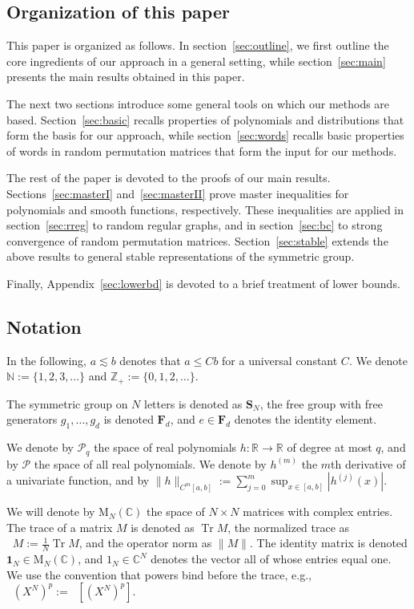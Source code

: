 \documentclass[10pt,reqno]{amsart}
\theoremstyle{definition}
\theoremstyle{remark}
\numberwithin{equation}{section}
\numberwithin{figure}{section}
\numberwithin{table}{section}
\newcommand{\tr}{\mathop{\mathrm{Tr}}}
\newcommand{\ntrN}{\mathop{\mathrm{tr}_N}}
\begin{document}
\subsection*{Organization of this paper}

This paper is organized as follows. In section~\ref{sec:outline}, we first 
outline the core ingredients of our approach in a general setting, while 
section~\ref{sec:main} presents the main results obtained in this paper.

The next two sections introduce some general tools on which our methods 
are based. Section~\ref{sec:basic} recalls properties of polynomials and 
distributions that form the basis for our approach, while 
section~\ref{sec:words} recalls basic properties of words in random 
permutation matrices that form the input for our methods.

The rest of the paper is devoted to the proofs of our main results. 
Sections~\ref{sec:masterI} and~\ref{sec:masterII} prove master 
inequalities for polynomials and smooth functions, respectively. These 
inequalities are applied in section~\ref{sec:rreg} to random regular 
graphs, and in section~\ref{sec:bc} to strong convergence of random 
permutation matrices. Section~\ref{sec:stable} extends the above 
results to general stable representations of the symmetric group.

Finally, Appendix~\ref{sec:lowerbd} is devoted to a brief treatment of
lower bounds.

\subsection*{Notation}

In the following, $a\lesssim b$ denotes that $a\le Cb$ for a universal 
constant $C$. We denote
$\mathbb{N}:=\{1,2,3,\ldots\}$ and $\mathbb{Z}_+:=\{0,1,2,\ldots\}$.

The symmetric group on $N$ letters is denoted as 
$\mathbf{S}_N$, the free group with free generators $g_1,\ldots,g_d$ 
is denoted $\mathbf{F}_d$, and $e\in\mathbf{F}_d$ denotes
the identity element.

We denote by $\mathcal{P}_q$ the space of real polynomials 
$h:\mathbb{R}\to\mathbb{R}$ of degree at most $q$, and by $\mathcal{P}$ 
the space of all real polynomials. We denote by $h^{(m)}$ the $m$th 
derivative of a univariate function, and by $\|h\|_{C^m[a,b]}:= 
\sum_{j=0}^m \sup_{x\in[a,b]} |h^{(j)}(x)|$.

We will denote by $\mathrm{M}_N(\mathbb{C})$ the space of $N\times N$ 
matrices with complex entries. The trace of a matrix $M$ is denoted as 
$\tr M$, the normalized trace as $\ntrN M := \frac{1}{N}\tr 
M$, and the operator norm as $\|M\|$. The identity matrix is denoted 
$\mathbf{1}_N\in 
\mathrm{M}_N(\mathbb{C})$, and $1_N\in\mathbb{C}^N$ denotes the vector all 
of whose entries equal one. We use the convention that powers bind
before the trace, e.g., $\ntrN (X^N)^p := \ntrN[(X^N)^p]$.
\end{document}
